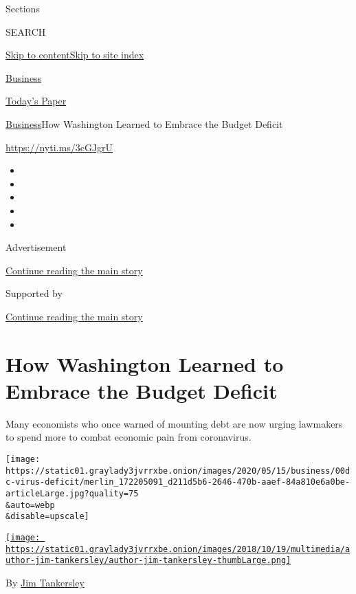 Sections

SEARCH

\protect\hyperlink{site-content}{Skip to
content}\protect\hyperlink{site-index}{Skip to site index}

\href{https://www.nytimes3xbfgragh.onion/section/business}{Business}

\href{https://myaccount.nytimes3xbfgragh.onion/auth/login?response_type=cookie\&client_id=vi}{}

\href{https://www.nytimes3xbfgragh.onion/section/todayspaper}{Today's
Paper}

\href{/section/business}{Business}\textbar{}How Washington Learned to
Embrace the Budget Deficit

\url{https://nyti.ms/3cGJgrU}

\begin{itemize}
\item
\item
\item
\item
\item
\end{itemize}

Advertisement

\protect\hyperlink{after-top}{Continue reading the main story}

Supported by

\protect\hyperlink{after-sponsor}{Continue reading the main story}

\hypertarget{how-washington-learned-to-embrace-the-budget-deficit}{%
\section{How Washington Learned to Embrace the Budget
Deficit}\label{how-washington-learned-to-embrace-the-budget-deficit}}

Many economists who once warned of mounting debt are now urging
lawmakers to spend more to combat economic pain from coronavirus.

\texttt{[image: https://static01.graylady3jvrrxbe.onion/images/2020/05/15/business/00dc-virus-deficit/merlin\_172205091\_d211d5b6-2646-470b-aaef-84a810e6a0be-articleLarge.jpg?quality=75\\\&auto=webp\\\&disable=upscale]}

\href{https://www.nytimes3xbfgragh.onion/by/jim-tankersley}{\texttt{[image: https://static01.graylady3jvrrxbe.onion/images/2018/10/19/multimedia/author-jim-tankersley/author-jim-tankersley-thumbLarge.png]}}

By \href{https://www.nytimes3xbfgragh.onion/by/jim-tankersley}{Jim
Tankersley}

